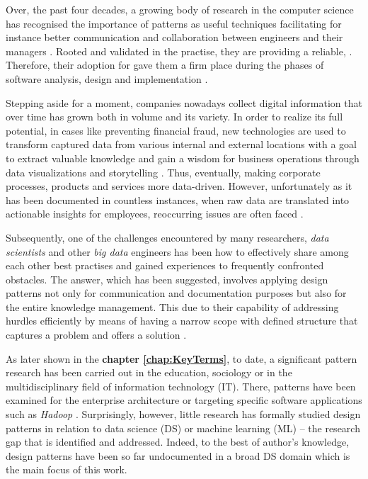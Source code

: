 Over, the past four decades, a growing body of research in the computer science has recognised the importance of patterns as useful techniques facilitating for instance better communication and collaboration between engineers and their managers \parencite{Schmidt:1996:SP:236156.236164}.  
Rooted and validated in the practise, they are  providing a reliable,  \parencites{Werner2006}[37]{Schmidt:1996:SP:236156.236164}.
Therefore, their adoption for  gave them a firm place during the phases of software analysis, design and implementation \parencites[47]{Stefan2017}{Chetan2016}.  

Stepping aside for a moment, companies nowadays collect digital information that over time has grown both in volume and its variety.
In order to realize its full potential, in cases like preventing financial fraud, new technologies are used to transform captured data from various internal and external locations with a goal to extract valuable knowledge and gain a wisdom for business operations through data visualizations and storytelling \parencite{NicolausHenke2016TheWorld}.
Thus, eventually, making corporate processes, products and services more data-driven.
However, unfortunately as it has been documented in countless instances, when raw data are translated into actionable insights for employees, reoccurring issues are often faced \parencites{HolleyKerrir2014}{Hossam2017}.

Subsequently, one of the challenges encountered by many researchers, \emph{data scientists} and other \emph{big data} engineers has been how to effectively share among each other best practises and gained experiences to frequently confronted obstacles.
The answer, which has been suggested, involves applying design patterns not only for communication and documentation purposes but also for the entire knowledge management. 
This due to their capability of addressing hurdles efficiently by means of having a narrow scope with defined structure that captures a problem and offers a solution \parencites{Hossam2017}{DeardenHCI2006}. 

As later shown in the \textbf{chapter \ref{chap:KeyTerms}}, to date, a significant pattern research has been carried out in the education, sociology or in the multidisciplinary field of information technology (\ac{IT}). 
There, patterns have been examined for the enterprise architecture or targeting specific software applications such as \emph{Hadoop} \parencites{Fowler2002}{MinerDonald2012}. 
Surprisingly, however, little research has formally studied design patterns in relation to data science (DS) or machine learning (ML) -- the research gap that is identified and addressed.
Indeed, to the best of author's knowledge, design patterns have been so far undocumented in a broad \ac{DS} domain which is the main focus of this work.

